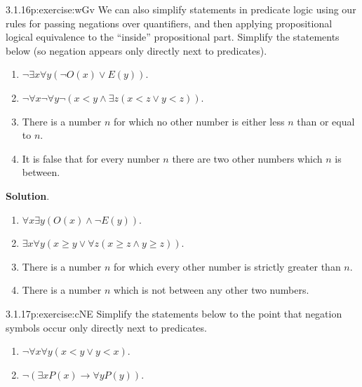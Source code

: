 \documentclass[twoside,11pt,]{book}
\newcommand{\blocktitlefont}{\relax}
\numberwithin{equation}{chapter}
\newcommand{\imp}{\rightarrow}
\newcommand{\lt}{<}
\begin{document}
\begin{divisionsolution}{3.1.16}{}{p:exercise:wGv}%
We can also simplify statements in predicate logic using our rules for passing negations over quantifiers, and then applying propositional logical equivalence to the ``inside'' propositional part. Simplify the statements below (so negation appears only directly next to predicates).%
\begin{enumerate}[label=(\alph*)]
\item{}\(\neg \exists x \forall y (\neg O(x) \vee E(y))\).%
\item{}\(\neg \forall x \neg \forall y \neg(x \lt y \wedge \exists z (x \lt z \vee y \lt z))\).%
\item{}There is a number \(n\) for which no other number is either less \(n\) than or equal to \(n\).%
\item{}It is false that for every number \(n\) there are two other numbers which \(n\) is between.%
\end{enumerate}
%
\par\smallskip%
\noindent\textbf{\blocktitlefont Solution}.\quad{}%
\begin{enumerate}[label=(\alph*)]
\item{}\(\forall x \exists y (O(x) \wedge \neg E(y))\).%
\item{}\(\exists x \forall y (x \ge y \vee \forall z (x \ge z \wedge y \ge z))\).%
\item{}There is a number \(n\) for which every other number is strictly greater than \(n\).%
\item{}There is a number \(n\) which is not between any other two numbers.%
\end{enumerate}
%
\end{divisionsolution}%
\begin{divisionsolution}{3.1.17}{}{p:exercise:cNE}%
Simplify the statements below to the point that negation symbols occur only directly next to predicates.%
\begin{enumerate}[label=(\alph*)]
\item{}\(\neg \forall x \forall y (x \lt y \vee y \lt x)\).%
\item{}\(\neg(\exists x P(x) \imp \forall y P(y))\).%
\end{enumerate}
%
\end{divisionsolution}%
\end{document}
